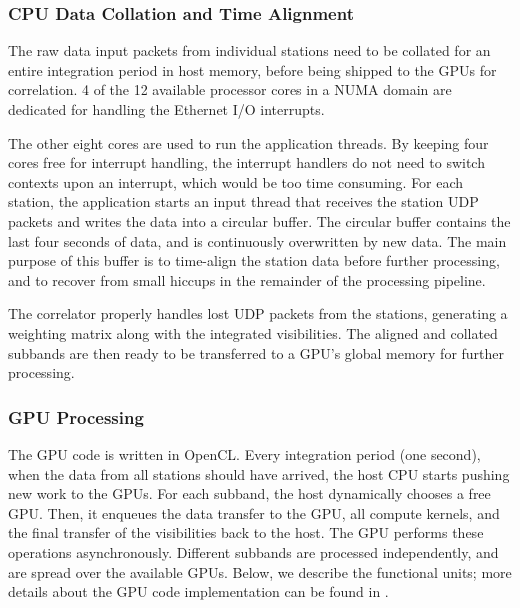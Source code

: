 \documentclass{ws-jai}
\begin{document}
\subsubsection  {CPU Data Collation and  Time Alignment}
The raw data input  packets from individual stations need to  be collated for an
entire integration period  in host memory, before being shipped  to the GPUs for
correlation.   4 of  the  12 available  processor  cores in  a  NUMA domain  are
dedicated for  handling the  Ethernet I/O interrupts. 

The other eight cores are used to  run the application threads.  By keeping four
cores free for interrupt handling, the  interrupt handlers do not need to switch
contexts  upon an  interrupt,  which  would be  too  time  consuming.  For  each
station, the  application starts an input  thread that receives the  station UDP
packets  and writes  the  data  into a  circular  buffer.   The circular  buffer
contains the last  four seconds of data, and is  continuously overwritten by new
data.  The main purpose of this buffer  is to time-align the station data before
further processing,  and to recover from  small hiccups in the  remainder of the
processing pipeline.

The correlator properly handles lost UDP packets from the stations, generating a
weighting  matrix  along  with  the integrated  visibilities.  The  aligned  and
collated subbands are then ready to be  transferred to a GPU’s global memory for
further processing.

\subsubsection {GPU Processing}
The GPU code is written in  OpenCL.  Every integration period (one second), when
the data from all stations should have  arrived, the host CPU starts pushing new
work to the  GPUs.  For each subband,  the host dynamically chooses  a free GPU.
Then, it  enqueues the data  transfer to the GPU,  all compute kernels,  and the
final transfer  of the visibilities  back to the  host.  The GPU  performs these
operations asynchronously.  Different subbands  are processed independently, and
are spread  over the available GPUs.   Below, we describe the  functional units;
more  details  about  the  GPU  code   implementation  can  be  found  in  \cite
{romein2016comparison}.\\

\end{document}
